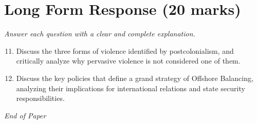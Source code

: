 \documentclass[12pt]{article}
\begin{document}
\section*{Long Form Response (20 marks)}
\textit{Answer each question with a clear and complete explanation.}
\begin{enumerate}[label=\arabic*.]
\setcounter{enumi}{10}
\item Discuss the three forms of violence identified by postcolonialism, and critically analyze why pervasive violence is not considered one of them.
\item Discuss the key policies that define a grand strategy of Offshore Balancing, analyzing their implications for international relations and state security responsibilities.
\end{enumerate}

\vfill
\noindent\textit{End of Paper}
\end{document}
